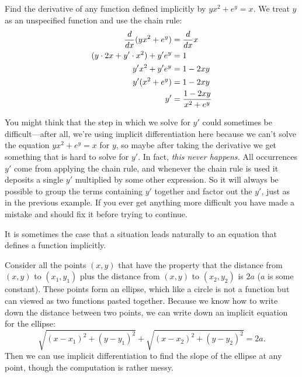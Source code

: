 \begin{example}
Find the derivative of any function defined implicitly by 
$yx^2+e^y=x$. We treat $y$ as an unspecified function and use the
chain rule:
\begin{align*}
{d\over dx}(yx^2+e^y)&={d\over dx}x \\
(y\cdot 2x+y'\cdot x^2)+y'e^y &= 1 \\
y'x^2+y'e^y&= 1-2xy \\
y'(x^2+e^y)&= 1-2xy \\
y'&={1-2xy\over x^2+e^y} \\
\end{align*}
\vskip-18pt\end{example}

You might think that the step in which we solve for $y'$ could
sometimes be difficult---after all, we're using implicit
differentiation here because we can't solve the equation
$yx^2+e^y=x$ for $y$, so maybe after taking the derivative we get
something that is hard to solve for $y'$. In fact, {\it this never
  happens.} All occurrences $y'$ come from applying the chain rule,
and whenever the chain rule is used it deposits a single $y'$
multiplied by some other expression. So it will always be possible to
group the terms containing $y'$ together and factor out the $y'$, just
as in the previous example. If you ever get anything more difficult
you have made a mistake and should fix it before trying to continue.

It is sometimes the case that a situation leads naturally to an
equation that defines a function implicitly. 

\begin{example} Consider all the points $(x,y)$ that have the property that 
the distance from $(x,y)$ to $(x_1,y_1)$ plus the distance 
from $(x,y)$ to $(x_2,y_2)$ is $2a$ ($a$ is some constant). These
points form an ellipse, which like a circle is not a function but can
viewed as two functions pasted together. Because we know how to write
down the distance between two points, we can write down an implicit
equation for the ellipse:
$$\sqrt{(x-x_1)^2+(y-y_1)^2}+\sqrt{(x-x_2)^2+(y-y_2)^2}=2a.$$
Then we can use implicit differentiation to find the slope of the
ellipse at any point, though the computation is rather messy.
\label{example:ellipse}
\end{example}

